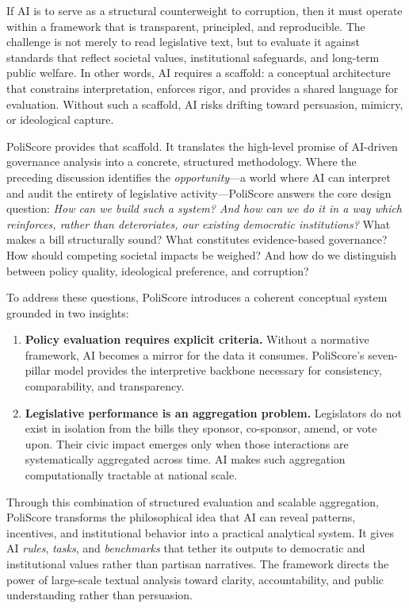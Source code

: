 \documentclass[12pt]{article}
\begin{document}
If AI is to serve as a structural counterweight to corruption, then it must operate within a framework that is
transparent, principled, and reproducible. The challenge is not merely to read legislative text, but to evaluate it
against standards that reflect societal values, institutional safeguards, and long-term public welfare. In other words,
AI requires a scaffold: a conceptual architecture that constrains interpretation, enforces rigor, and provides a shared
language for evaluation. Without such a scaffold, AI risks drifting toward persuasion, mimicry, or ideological capture.

PoliScore provides that scaffold. It translates the high-level promise of AI-driven governance analysis into a concrete,
structured methodology. Where the preceding discussion identifies the \emph{opportunity}—a world where AI can interpret
and audit the entirety of legislative activity—PoliScore answers the core design question: \emph{How can we build such a system?
And how can we do it in a way which reinforces, rather than deteroriates, our existing democratic institutions?} What makes a bill
structurally sound? What constitutes evidence-based governance? How should competing societal impacts be weighed? And how do we
distinguish between policy quality, ideological preference, and corruption?

To address these questions, PoliScore introduces a coherent conceptual system grounded in two insights:

\begin{enumerate}
    \item \textbf{Policy evaluation requires explicit criteria.}  
    Without a normative framework, AI becomes a mirror for the data it consumes. PoliScore's seven-pillar model provides
    the interpretive backbone necessary for consistency, comparability, and transparency.

    \item \textbf{Legislative performance is an aggregation problem.}  
    Legislators do not exist in isolation from the bills they sponsor, co-sponsor, amend, or vote upon. Their civic
    impact emerges only when those interactions are systematically aggregated across time. AI makes such aggregation
    computationally tractable at national scale.
\end{enumerate}

Through this combination of structured evaluation and scalable aggregation, PoliScore transforms the philosophical idea
that AI can reveal patterns, incentives, and institutional behavior into a practical analytical system. It gives AI
\emph{rules}, \emph{tasks}, and \emph{benchmarks} that tether its outputs to democratic and institutional values rather
than partisan narratives. The framework directs the power of large-scale textual analysis toward clarity, accountability,
and public understanding rather than persuasion.
\end{document}
